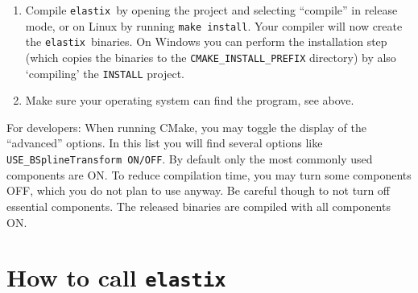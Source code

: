 \documentclass[]{report}
\newcommand{\elastix}{\texttt{elastix}}
\begin{document}
\begin{enumerate}
\begin{enumerate}
    \item Linux: run CMake from the folder where you want the binaries
        to be created, with as command line argument the folder in
        which the sources were extracted: \texttt{ccmake <src-folder>}.
        Set the \texttt{CMAKE\_BUILD\_TYPE} to ``Release'' and the
        \texttt{CMAKE\_INSTALL\_PREFIX} to the directory where you want
        \elastix\ installed.
    \end{enumerate}
CMake will create a project or solution or make file for your
compiler.

\item Compile \elastix\ by opening the project and selecting ``compile'' in
    release mode, or on Linux by running \texttt{make install}. Your
    compiler will now create the \elastix\ binaries. On Windows you can
    perform the installation step (which copies the binaries to the
    \texttt{CMAKE\_INSTALL\_PREFIX} directory) by also `compiling' the
    \texttt{INSTALL} project.

\item Make sure your operating system can find the program, see
above.
\end{enumerate}

For developers: When running CMake, you may toggle the display of the
``advanced'' options. In this list you will find several options like
\texttt{USE\_BSplineTransform ON/OFF}. By default only the most commonly used
components are ON. To reduce compilation time, you may turn some components
OFF, which you do not plan to use anyway. Be careful though to not turn off
essential components. The released binaries are compiled with all components
ON.

\section{How to call \elastix}\label{sec:elastix:call}
\end{document}
